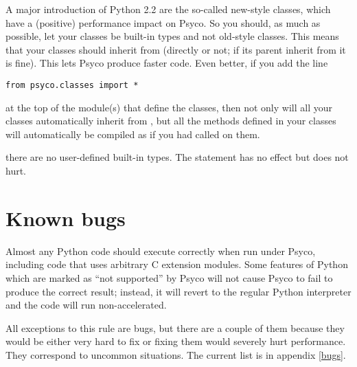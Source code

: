 \documentclass{manual}
\begin{document}
A major introduction of Python 2.2 are the so-called new-style classes, which have a (positive) performance impact on Psyco.  So  you should, as much as possible, let your classes be built-in types and not old-style classes.  This means that your classes should inherit from  (directly or not; if its parent inherit from  it is fine).  This lets Psyco produce faster code.  Even better, if you add the line

\begin{verbatim}
from psyco.classes import *
\end{verbatim}

at the top of the module(s) that define the classes, then not only will all your classes automatically inherit from , but all the methods defined in your classes will automatically be compiled as if you had called  on them.


 there are no user-defined built-in types.  The statement  has no effect but does not hurt.


\section{Known bugs}

Almost any Python code should execute correctly when run under Psyco, including code that uses arbitrary C extension modules.  Some features of Python which are marked as ``not supported'' by Psyco will not cause Psyco to fail to produce the correct result; instead, it will revert to the regular Python interpreter and the code will run non-accelerated.

All exceptions to this rule are bugs, but there are a couple of them because they would be either very hard to fix or fixing them would severely hurt performance.  They correspond to uncommon situations.  The current list is in appendix \ref{bugs}.




\end{document}
